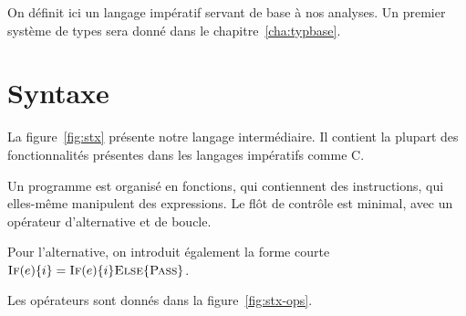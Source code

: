 On définit ici un langage impératif servant de base à nos analyses. Un premier
système de types sera donné dans le chapitre~\ref{cha:typbase}.

\section{Syntaxe}

La figure~\ref{fig:stx} présente notre langage intermédiaire. Il contient la
plupart des fonctionnalités présentes dans les langages impératifs comme C.

Un programme est organisé en fonctions, qui contiennent des instructions, qui
elles-même manipulent des expressions. Le flôt de contrôle est minimal, avec un
opérateur d'alternative et de boucle.

Pour l'alternative, on introduit également la forme courte $\textsc{If}(e) \{ i \} =
\textsc{If}(e) \{ i \} \textsc{Else} \{ \textsc{Pass} \}$.

Les opérateurs sont donnés dans la figure~\ref{fig:stx-ops}.

